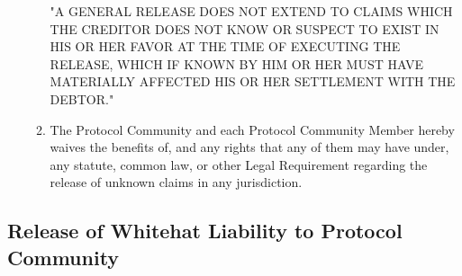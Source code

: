 \documentclass{article}
\begin{document}
\begin{enumerate}[label=\Alph*.]
\begin{enumerate}
                    "A GENERAL RELEASE DOES NOT EXTEND TO CLAIMS WHICH THE CREDITOR DOES NOT KNOW OR SUSPECT TO EXIST IN HIS OR HER FAVOR AT THE TIME OF EXECUTING THE RELEASE, WHICH IF KNOWN BY HIM OR HER MUST HAVE MATERIALLY AFFECTED HIS OR HER SETTLEMENT WITH THE DEBTOR."

              \item The Protocol Community and each Protocol Community Member hereby waives the benefits of, and any rights that any of them may have under, any statute, common law, or other Legal Requirement regarding the release of unknown claims in any jurisdiction.
          \end{enumerate}
\end{enumerate}

\subsection{Release of Whitehat Liability to Protocol Community}\label{subsec:release_whitehat_liability_protocol_community}
\end{document}
